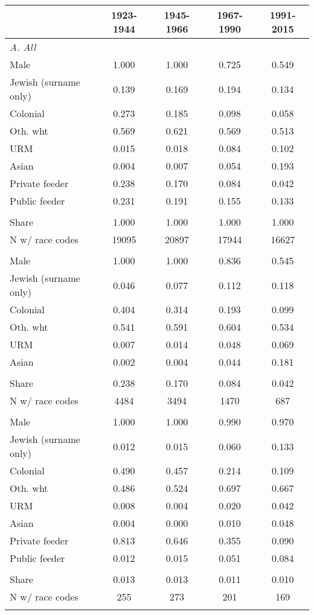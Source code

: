 \begin{tabular}{l*{4}{c}}
& 1923-1944& 1945-1966& 1967-1990& 1991-2015\\
\midrule
\multicolumn{3}{l}{\emph{A. All}}\\
Male	&    1.000	&    1.000	&    0.725	&    0.549\\
Jewish (surname only)	&    0.139	&    0.169	&    0.194	&    0.134\\
Colonial	&    0.273	&    0.185	&    0.098	&    0.058\\
Oth. wht	&    0.569	&    0.621	&    0.569	&    0.513\\
URM	&    0.015	&    0.018	&    0.084	&    0.102\\
Asian	&    0.004	&    0.007	&    0.054	&    0.193\\
Private feeder	&    0.238	&    0.170	&    0.084	&    0.042\\
Public feeder	&    0.231	&    0.191	&    0.155	&    0.133\\
\\
Share&1.000&1.000&1.000&1.000\\
N w/ race codes&    19095&    20897&    17944&    16627\\ \addlinespace
\multicolumn{3}{l}{\emph{B. Private feeder HS}}\\
Male	&    1.000	&    1.000	&    0.836	&    0.545\\
Jewish (surname only)	&    0.046	&    0.077	&    0.112	&    0.118\\
Colonial	&    0.404	&    0.314	&    0.193	&    0.099\\
Oth. wht	&    0.541	&    0.591	&    0.604	&    0.534\\
URM	&    0.007	&    0.014	&    0.048	&    0.069\\
Asian	&    0.002	&    0.004	&    0.044	&    0.181\\
\\
Share&0.238&0.170&0.084&0.042\\
N w/ race codes&     4484&     3494&     1470&      687\\ \addlinespace
\multicolumn{3}{l}{\emph{C. In A.D. club}}\\
Male	&    1.000	&    1.000	&    0.990	&    0.970\\
Jewish (surname only)	&    0.012	&    0.015	&    0.060	&    0.133\\
Colonial	&    0.490	&    0.457	&    0.214	&    0.109\\
Oth. wht	&    0.486	&    0.524	&    0.697	&    0.667\\
URM	&    0.008	&    0.004	&    0.020	&    0.042\\
Asian	&    0.004	&    0.000	&    0.010	&    0.048\\
Private feeder	&    0.813	&    0.646	&    0.355	&    0.090\\
Public feeder	&    0.012	&    0.015	&    0.051	&    0.084\\
\\
Share&0.013&0.013&0.011&0.010\\
N w/ race codes&      255&      273&      201&      169\\ \addlinespace
\bottomrule
\end{tabular}